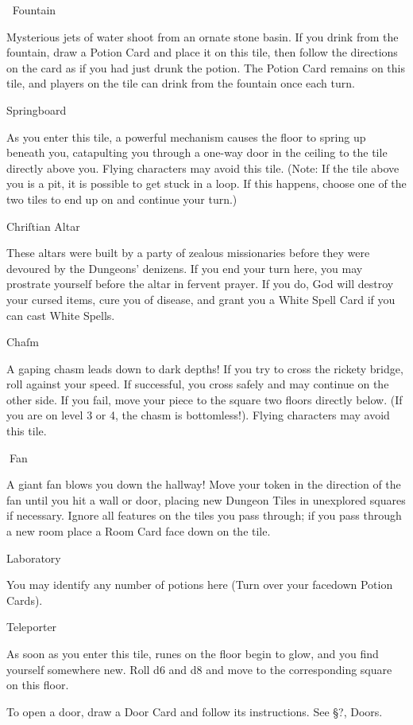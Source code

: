 \documentclass{book}
\begin{document}
\begin{itemize}
Fountain

Mysterious jets of water shoot from an ornate stone basin. If
you drink from the fountain, draw a Potion Card and place
it on this tile, then follow the directions on the card as if you
had just drunk the potion. The Potion Card remains on this
tile, and players on the tile can drink from the fountain once
each turn.

Springboard

As you enter this tile, a powerful mechanism causes the floor
to spring up beneath you, catapulting you through a one-way
door in the ceiling to the tile directly above you.
Flying characters may avoid this tile.
(Note: If the tile above you is a pit, it is possible to get stuck in a loop. If this
happens, choose one of the two tiles to end up on and continue your turn.)

Chriſtian Altar

These altars were built by a party of zealous missionaries before
they were devoured by the Dungeons’ denizens. If you end
your turn here, you may prostrate yourself before the altar in
fervent prayer. If you do, God will destroy your cursed items,
cure you of disease, and grant you a White Spell Card if you
can cast White Spells.

Chaſm

A gaping chasm leads down to dark depths! If you try to cross
the rickety bridge, roll against your speed. If successful, you
cross safely and may continue on the other side. If you fail,
move your piece to the square two floors directly below. (If
you are on level 3 or 4, the chasm is bottomless!).
Flying characters may avoid this tile.

Fan

A giant fan blows you down the hallway! Move your token
in the direction of the fan until you hit a wall or door, placing
new Dungeon Tiles in unexplored squares if necessary. Ignore
all features on the tiles you pass through; if you pass through a
new room place a Room Card face down on the tile.

Laboratory

You may identify any number of potions here (Turn over your
facedown Potion Cards).

Teleporter

As soon as you enter this tile, runes on the floor begin to glow,
and you find yourself somewhere new. Roll d6 and d8 and
move to the corresponding square on this floor.

To open a door, draw a Door Card and follow its
instructions. See §?, Doors.


\end{itemize}
\end{document}
